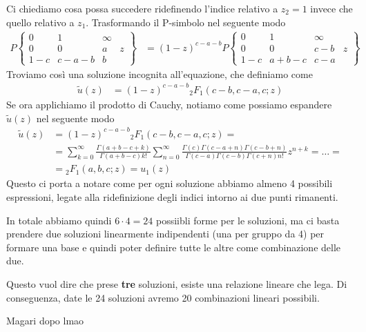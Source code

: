 Ci chiediamo cosa possa succedere ridefinendo l'indice relativo a $z_2=1$ invece che quello relativo a $z_1$.
Trasformando il P-simbolo nel seguente modo
\begin{align}
	P\left\{\begin{matrix}
		0   & 1     & \infty & \\
		0   & 0     & a      & z\\
		1-c & c-a-b & b      & 
	\end{matrix}\right\} &= (1-z)^{c-a-b} P\left\{\begin{matrix}
		0   & 1     & \infty & \\
		0 	& 0     & c-b  & z\\
		1-c & a+b-c & c-a  & 
	\end{matrix}\right\}
\end{align}
Troviamo così una soluzione incognita all'equazione, che definiamo come
\begin{align}
	\tilde{u}(z) &= (1-z)^{c-a-b} {}_2F_1(c-b,c-a,c; z)
\end{align}
Se ora applichiamo il prodotto di Cauchy, notiamo come possiamo espandere $\tilde{u}(z)$ nel seguente modo
\begin{align}
	\tilde{u}(z) &= (1-z)^{c-a-b} {}_2F_1(c-b,c-a,c; z) = \nonumber\\
				 &= \sum_{k=0}^{\infty} \frac{\Gamma(a+b-c+k)}{\Gamma(a+b-c) k!}\sum_{n=0}^{\infty} \frac{\Gamma(c)\Gamma (c-a+n)\Gamma (c-b+n)}{\Gamma (c-a)\Gamma (c-b)\Gamma (c+n)n!}z^{n+k} =\dots= \nonumber\\
				 &= {}_2F_1(a,b,c; z) = u_1(z)
\end{align}
Questo ci porta a notare come per ogni soluzione abbiamo almeno 4 possibili espressioni, legate alla ridefinizione degli indici intorno ai due punti rimanenti.

In totale abbiamo quindi $6\cdot4=24$ possiibli forme per le soluzioni, ma ci basta prendere due soluzioni linearmente indipendenti (una per gruppo da 4) per formare una base e quindi poter definire tutte le altre come combinazione delle due.

Questo vuol dire che prese \textbf{tre} soluzioni, esiste una relazione lineare che lega. Di conseguenza, date le 24 soluzioni avremo 20 combinazioni lineari possibili.

Magari dopo lmao

\newpage

